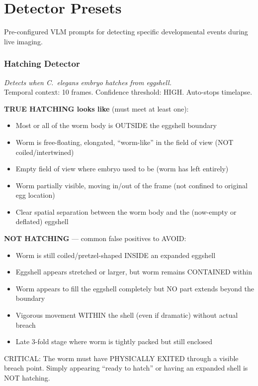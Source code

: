 \documentclass[11pt,letterpaper]{article}
\begin{document}
\part*{Detector Presets}

Pre-configured VLM prompts for detecting specific developmental events during live imaging.

\section{Hatching Detector}

\textit{Detects when \textit{C.\ elegans} embryo hatches from eggshell.}\\
Temporal context: 10 frames. Confidence threshold: HIGH. Auto-stops timelapse.

\textbf{TRUE HATCHING looks like} (must meet at least one):
\begin{itemize}
    \item Most or all of the worm body is OUTSIDE the eggshell boundary
    \item Worm is free-floating, elongated, ``worm-like'' in the field of view (NOT coiled/intertwined)
    \item Empty field of view where embryo used to be (worm has left entirely)
    \item Worm partially visible, moving in/out of the frame (not confined to original egg location)
    \item Clear spatial separation between the worm body and the (now-empty or deflated) eggshell
\end{itemize}

\textbf{NOT HATCHING} --- common false positives to AVOID:
\begin{itemize}
    \item Worm is still coiled/pretzel-shaped INSIDE an expanded eggshell
    \item Eggshell appears stretched or larger, but worm remains CONTAINED within
    \item Worm appears to fill the eggshell completely but NO part extends beyond the boundary
    \item Vigorous movement WITHIN the shell (even if dramatic) without actual breach
    \item Late 3-fold stage where worm is tightly packed but still enclosed
\end{itemize}

CRITICAL: The worm must have PHYSICALLY EXITED through a visible breach point.
Simply appearing ``ready to hatch'' or having an expanded shell is NOT hatching.
\end{document}
